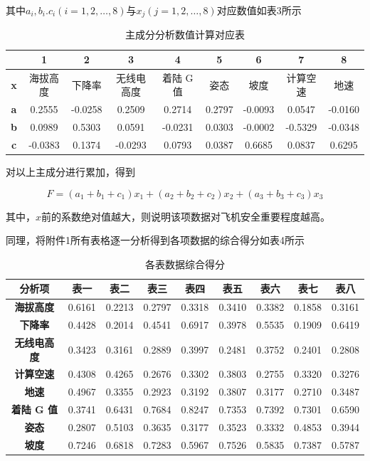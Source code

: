\documentclass[UTF8]{ctexart}
\begin{document}
	其中$a_i,b_i.c_i\left( i=1,2,…,8 \right) $与$x_j\left( j=1,2,…,8 \right) $对应数值如表3所示  \par 
	\begin{table}[!ht]
		\centering
		\caption{主成分分析数值计算对应表  }
		\begin{tabular}{|c|cccccccc|}
			\hline
			\textbf{} & \textbf{1} & \textbf{2} & \textbf{3} & \textbf{4} & \textbf{5} & \textbf{6} & \textbf{7} & \textbf{8} \\ \hline
			\textbf{x} & 海拔高度  & 下降率  & 无线电高度  & 着陆 G 值  & 姿态  & 坡度  & 计算空速  & 地速  \\ 
			\textbf{a} & 0.2555 & -0.0258 & 0.2509 & 0.2714 & 0.2797 & -0.0093 & 0.0547 & -0.0160 \\ 
			\textbf{b} & 0.0989 & 0.5303 & 0.0591 & -0.0231 & 0.0303 & -0.0002 & -0.5329 & -0.0348 \\ 
			\textbf{c} & -0.0383 & 0.1374 & -0.0293 & 0.0793 & 0.0387 & 0.6685 & 0.0837 & 0.6295 \\ \hline
		\end{tabular}
	\end{table} \par 
	对以上主成分进行累加，得到  \par 
	\begin{equation}
		F=\left( a_1+b_1+c_1 \right) x_1+\left( a_2+b_2+c_2 \right) x_2+\left( a_3+b_3+c_3 \right) x_3
	\end{equation}\par
	其中，$x$前的系数绝对值越大，则说明该项数据对飞机安全重要程度越高。\par
	同理，将附件1所有表格逐一分析得到各项数据的综合得分如表4所示\par
	\begin{table}[!ht]
		\centering
		\caption{各表数据综合得分 }
		\begin{tabular}{|c|cccccccc|}
			\hline
			\textbf{分析项 } & \textbf{表一 } & \textbf{表二 } & \textbf{表三 } & \textbf{表四 } & \textbf{表五 } & \textbf{表六 } & \textbf{表七 } & \textbf{表八 } \\ \hline
			\textbf{海拔高度 } & 0.6161 & 0.2213 & 0.2797 & 0.3318 & 0.3410 & 0.3382 & 0.1858 & 0.3161 \\ 
			\textbf{下降率 } & 0.4428 & 0.2014 & 0.4541 & 0.6917 & 0.3978 & 0.5535 & 0.1909 & 0.6419 \\ 
			\textbf{无线电高度 } & 0.3423 & 0.3161 & 0.2889 & 0.3997 & 0.2481 & 0.3752 & 0.2401 & 0.2808 \\ 
			\textbf{计算空速 } & 0.4308 & 0.4265 & 0.2676 & 0.3302 & 0.3803 & 0.2755 & 0.3320 & 0.3276 \\ 
			\textbf{地速 } & 0.4967 & 0.3355 & 0.2923 & 0.3192 & 0.3807 & 0.3177 & 0.2710 & 0.3487 \\ 
			\textbf{着陆 G 值 } & 0.3741 & 0.6431 & 0.7684 & 0.8247 & 0.7353 & 0.7392 & 0.7301 & 0.6590 \\ 
			\textbf{姿态 } & 0.2807 & 0.5103 & 0.3635 & 0.3177 & 0.3523 & 0.3332 & 0.4853 & 0.3944 \\ 
			\textbf{坡度 } & 0.7246 & 0.6818 & 0.7283 & 0.5967 & 0.7526 & 0.5835 & 0.7387 & 0.5787 \\ \hline
		\end{tabular}
	\end{table}\par
\end{document}

